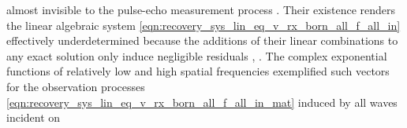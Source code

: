 almost invisible to
the pulse-echo measurement process
\cite[Sects. 6.9.1 and 6.9.4]{book:Devaney2012}.
Their existence renders
the linear algebraic system
\eqref{eqn:recovery_sys_lin_eq_v_rx_born_all_f_all_in} effectively underdetermined because
the additions of
their linear combinations to
any exact solution only induce
negligible residuals
\cite[4]{book:Hansen2010},
\cite[1, 3]{book:Hansen1998}.
The complex exponential functions of
relatively low and
high spatial frequencies exemplified
such vectors for
the observation processes
\eqref{eqn:recovery_sys_lin_eq_v_rx_born_all_f_all_in_mat} induced by
all waves incident on
